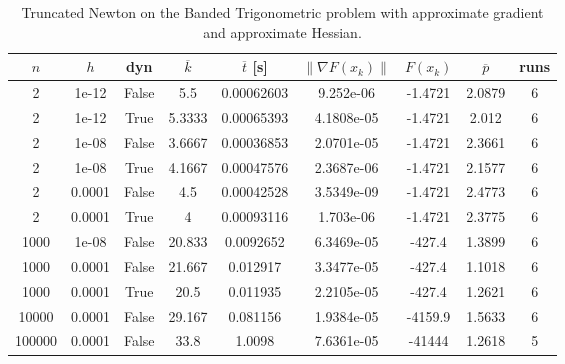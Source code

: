 \begin{table}
\caption{Truncated Newton on the Banded Trigonometric problem with approximate gradient and approximate Hessian.}
\label{tab:tn_trig_all_aprox}
\begin{tabular}{ccccccccc}
\toprule
$n$ & $h$ & dyn & $\overline{k}$ & $\overline{t}$ [s] & $\|\nabla F(x_k)\|$ & $F(x_k)$ & $\overline{p}$ & runs \\
\midrule
2 & 1e-12 & False & 5.5 & 0.00062603 & 9.252e-06 & -1.4721 & 2.0879 & 6 \\
2 & 1e-12 & True & 5.3333 & 0.00065393 & 4.1808e-05 & -1.4721 & 2.012 & 6 \\
2 & 1e-08 & False & 3.6667 & 0.00036853 & 2.0701e-05 & -1.4721 & 2.3661 & 6 \\
2 & 1e-08 & True & 4.1667 & 0.00047576 & 2.3687e-06 & -1.4721 & 2.1577 & 6 \\
2 & 0.0001 & False & 4.5 & 0.00042528 & 3.5349e-09 & -1.4721 & 2.4773 & 6 \\
2 & 0.0001 & True & 4 & 0.00093116 & 1.703e-06 & -1.4721 & 2.3775 & 6 \\
1000 & 1e-08 & False & 20.833 & 0.0092652 & 6.3469e-05 & -427.4 & 1.3899 & 6 \\
1000 & 0.0001 & False & 21.667 & 0.012917 & 3.3477e-05 & -427.4 & 1.1018 & 6 \\
1000 & 0.0001 & True & 20.5 & 0.011935 & 2.2105e-05 & -427.4 & 1.2621 & 6 \\
10000 & 0.0001 & False & 29.167 & 0.081156 & 1.9384e-05 & -4159.9 & 1.5633 & 6 \\
100000 & 0.0001 & False & 33.8 & 1.0098 & 7.6361e-05 & -41444 & 1.2618 & 5 \\
\bottomrule
\end{tabular}
\end{table}
